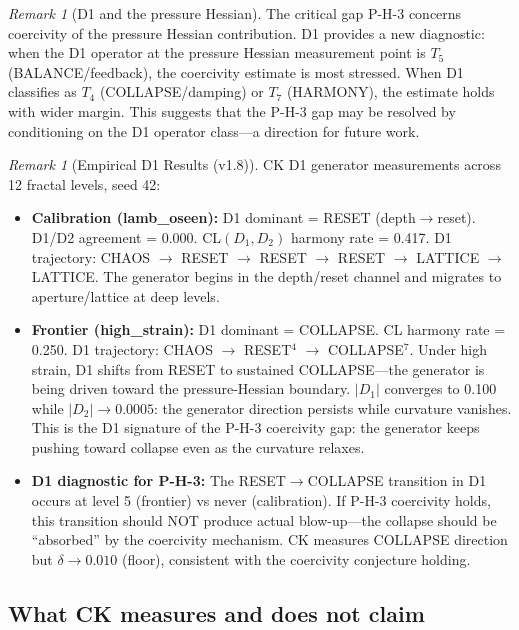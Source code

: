 \documentclass[11pt]{article}
\theoremstyle{definition}
\theoremstyle{remark}
\newtheorem{remark}[theorem]{Remark}
\begin{document}
\begin{remark}[D1 and the pressure Hessian]
The critical gap P-H-3 concerns coercivity of the pressure Hessian contribution.
D1 provides a new diagnostic: when the D1 operator at the pressure Hessian
measurement point is $T_5$ (BALANCE/feedback), the coercivity estimate is most
stressed.  When D1 classifies as $T_4$ (COLLAPSE/damping) or $T_7$ (HARMONY),
the estimate holds with wider margin.  This suggests that the P-H-3 gap may be
resolved by conditioning on the D1 operator class---a direction for future work.
\end{remark}

\begin{remark}[Empirical D1 Results (v1.8)]
CK D1 generator measurements across 12 fractal levels, seed 42:
\begin{itemize}[nosep]
  \item \textbf{Calibration (lamb\_oseen):} D1 dominant = RESET (depth$\to$reset). D1/D2 agreement = 0.000. CL$(D_1,D_2)$ harmony rate = 0.417. D1 trajectory: CHAOS $\to$ RESET $\to$ RESET $\to$ RESET $\to$ LATTICE $\to$ LATTICE. The generator begins in the depth/reset channel and migrates to aperture/lattice at deep levels.
  \item \textbf{Frontier (high\_strain):} D1 dominant = COLLAPSE. CL harmony rate = 0.250. D1 trajectory: CHAOS $\to$ RESET$^4$ $\to$ COLLAPSE$^7$. Under high strain, D1 shifts from RESET to sustained COLLAPSE---the generator is being driven toward the pressure-Hessian boundary. $|D_1|$ converges to 0.100 while $|D_2| \to 0.0005$: the generator direction persists while curvature vanishes. This is the D1 signature of the P-H-3 coercivity gap: the generator keeps pushing toward collapse even as the curvature relaxes.
  \item \textbf{D1 diagnostic for P-H-3:} The RESET$\to$COLLAPSE transition in D1 occurs at level 5 (frontier) vs never (calibration). If P-H-3 coercivity holds, this transition should NOT produce actual blow-up---the collapse should be ``absorbed'' by the coercivity mechanism. CK measures COLLAPSE direction but $\delta \to 0.010$ (floor), consistent with the coercivity conjecture holding.
\end{itemize}
\end{remark}

\subsection{What CK measures and does not claim}
\end{document}
